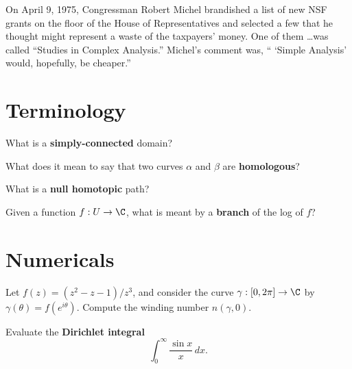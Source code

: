 \documentclass{homework}
\author{Jim Fowler}
\begin{document}
\maketitle

\begin{inspiration}
  On April 9, 1975, Congressman Robert Michel brandished a list of new
  NSF grants on the floor of the House of Representatives and selected
  a few that he thought might represent a waste of the taxpayers'
  money. One of them \ldots was called ``Studies in Complex
  Analysis.'' Michel's comment was, `` `Simple Analysis' would,
  hopefully, be cheaper.''
\end{inspiration}

\section{Terminology}

\begin{problem}
  What is a \textbf{simply-connected} domain?
\end{problem}

\begin{problem}
  What does it mean to say that two curves $\alpha$ and $\beta$ are
  \textbf{homologous}?
\end{problem}

\begin{problem}
  What is a \textbf{null homotopic} path?
\end{problem}

\begin{problem}
  Given a function $f : U \to \C$, what is meant by a \textbf{branch} of the log of $f$?
\end{problem}

\section{Numericals}

\begin{problem}
  Let $f(z) = (z^2-z-1)/z^3$, and consider the curve
  $\gamma : [0,2\pi] \to \C$ by $\gamma(\theta) = f(e^{i\theta})$.
  Compute the winding number $n(\gamma,0)$.
\end{problem}

\begin{problem}
  Evaluate the \textbf{Dirichlet integral}
  \[
    \int_0^\infty \frac{\sin x}{x} \, dx.
  \]
\end{problem}
\end{document}
